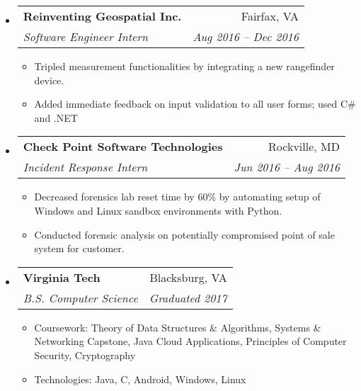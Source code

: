 \documentclass[letterpaper,11pt]{article}
\makeatletter
\newcommand{\resitem}[1]{\item #1 \vspace{-2pt}}
\newcommand{\resheading}[1]{{\large \parashade[.9]{sharpcorners}{\textbf{#1 \vphantom{p\^{E}}}}}}
\newcommand{\ressubheading}[4]{
    \begin{tabular*}{6.5in}{l@{\extracolsep{\fill}}r}
		\textbf{#1} & #2 \\
		\textit{#3} & \textit{#4} \\
\end{tabular*}\vspace{-6pt}}
\makeatother
\begin{document}
\begin{itemize}
\begin{itemize}
	\end{itemize}
	
\item[]
	\ressubheading{Reinventing Geospatial Inc.}{Fairfax, VA}{Software Engineer Intern}{Aug 2016 -- Dec 2016}
	\begin{itemize}
	    \resitem{Tripled measurement functionalities by integrating a new rangefinder device.}{}
	    \resitem{Added immediate feedback on input validation to all user forms; used C\# and .NET}{}
	\end{itemize}

\item[]
	\ressubheading{Check Point Software Technologies}{Rockville, MD}{Incident Response Intern}{Jun 2016 -- Aug 2016}
	\begin{itemize}
	    \resitem{Decreased forensics lab reset time by 60\% by automating setup of Windows and Linux sandbox environments with Python.}{}
		\resitem{Conducted forensic analysis on potentially compromised point of sale system for customer.}
	\end{itemize}

\iffalse
\item[]
	\ressubheading{Design For America at Virginia Tech}{Blacksburg, VA}{Project Co-Lead}{Sept 2015 -- May 2016}
	\begin{itemize}
	    \resitem{Increased access to Virginia Tech athletic clubs and their events by leading a team to design and create an Android application backed by VT Athletics data.}{}
	\end{itemize}
\fi

\end{itemize}

\vspace{-0.2in}

\resheading{Education}
\vspace{-0.2in}
\begin{itemize}
\item[] 
    \ressubheading{Virginia Tech}{Blacksburg, VA}{B.S. Computer Science}{Graduated 2017}
    \begin{itemize}
        \resitem{Coursework: Theory of Data Structures \& Algorithms, Systems \& Networking Capstone, Java Cloud Applications, Principles of Computer Security, Cryptography}{}
        \resitem{Technologies: Java, C, Android, Windows, Linux}
    \end{itemize}
\end{itemize}
\end{document}
